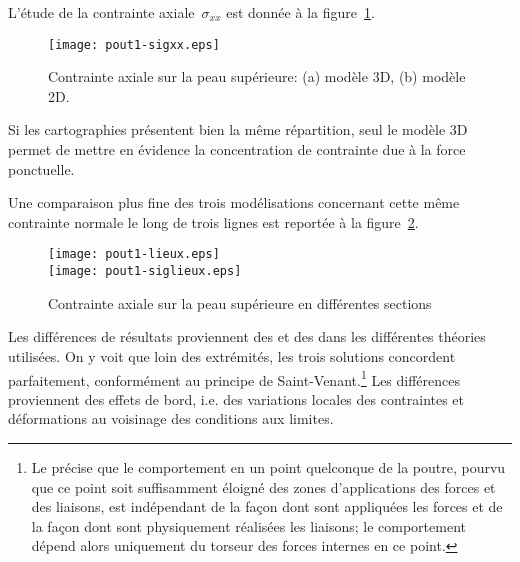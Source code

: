 \medskip
L'étude de la contrainte axiale~$\sigma_{xx}$ est donnée à la figure~\ref{Pout1-sigxx}.
\begin{figure}[ht]
\centering
\texttt{[image: pout1-sigxx.eps]}
\caption{Contrainte axiale sur la peau supérieure: (a) modèle 3D, (b) modèle 2D.}\label{Pout1-sigxx}
\end{figure}
Si les cartographies présentent bien la même répartition, seul le modèle 3D permet de mettre en évidence la concentration de contrainte due à la force ponctuelle.

\medskip
Une comparaison plus fine des trois modélisations concernant cette même contrainte normale le long de trois lignes est reportée à la figure~\ref{Pout1-siglieux}.
\begin{figure}[ht]
\centering
\texttt{[image: pout1-lieux.eps]}\\
\texttt{[image: pout1-siglieux.eps]}
\caption{Contrainte axiale sur la peau supérieure en différentes sections}\label{Pout1-siglieux}
\end{figure}
Les différences de résultats proviennent des  et des  dans les différentes théories utilisées.
On y voit que loin des extrémités, les trois solutions concordent parfaitement, conformément au principe de Saint-Venant.\footnote{Le  précise que le comportement en un point quelconque de la poutre, pourvu que ce point soit suffisamment éloigné des zones d'applications des forces et des liaisons, est indépendant de la façon dont sont appliquées les forces et de la façon dont sont physiquement réalisées les liaisons; le comportement dépend alors uniquement du torseur des forces internes en ce point.} Les différences proviennent des effets de bord, i.e. des variations locales des contraintes et déformations au voisinage des conditions aux limites.

